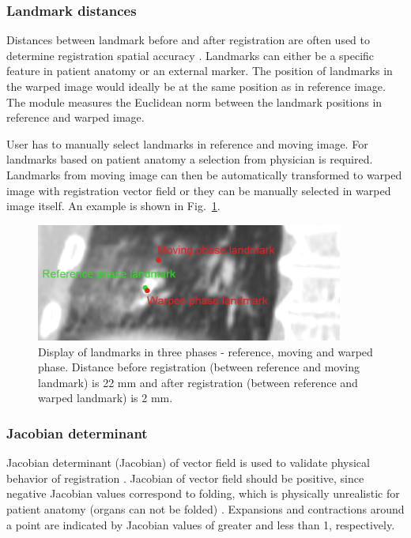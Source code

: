 \documentclass[type=dr, dr=rernat, accentcolor=tud7b,colorbacktitle, bigchapter, openright, twoside, 12pt ]{tudthesis}
\begin{document}
\subsubsection{Landmark distances}

Distances between landmark before and after registration are often used to determine registration spatial accuracy \cite{Castillo2009}. 
Landmarks can either be a specific feature in patient anatomy or an external marker. The position of landmarks in the warped image would ideally 
be at the same position as in reference image. The module measures the Euclidean norm between the landmark positions in reference and warped image.

User has to manually select landmarks in reference and moving image. For landmarks based on patient anatomy a selection from physician is required. 
Landmarks from moving image can then be automatically transformed to warped image with registration vector field or they can be manually selected in warped image itself. An example is shown in Fig.~\ref{landmark}.

\begin{figure}[H]
\begin{center}
\includegraphics[width=0.9\textwidth]{./Images/landmark.png}
\caption{Display of landmarks in three phases - reference, moving and warped phase. Distance before registration (between reference and moving landmark) is 22 mm and after registration
(between reference and warped landmark) is 2 mm.}
\label{landmark}
\end{center}
\end{figure}


\subsubsection{Jacobian determinant}
\label{Jacobian}

Jacobian determinant (Jacobian) of vector field is used to validate physical behavior of registration \cite{Leow2007}. 
Jacobian of vector field should be positive, since negative Jacobian values correspond to folding, 
which is physically unrealistic for patient anatomy (organs can not be folded) \cite{ Rey2002, Chen2008}. 
Expansions and contractions around a point are indicated by Jacobian values of greater and less than 1, respectively. 
\end{document}

